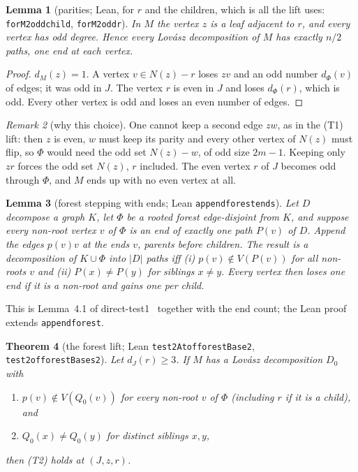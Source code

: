 \documentclass[11pt]{amsart}
\newtheorem{theorem}{Theorem}[section]
\newtheorem{lemma}[theorem]{Lemma}
\theoremstyle{definition}
\theoremstyle{remark}
\newtheorem{remark}[theorem]{Remark}
\renewcommand{\_}{\oldunderscore\allowbreak}
\begin{document}
\begin{lemma}[parities; Lean, for $r$ and the children, which is all the lift uses:
\texttt{forM2\_odd\_child}, \texttt{forM2\_odd\_r}]\label{lem:M}
In $M$ the vertex $z$ is a leaf adjacent to $r$, and \emph{every} vertex has odd degree. Hence every
Lov\'asz decomposition of $M$ has exactly $n/2$ paths, one end at each vertex.
\end{lemma}

\begin{proof}
$d_M(z)=1$. A vertex $v\in N(z)-r$ loses $zv$ and an odd number $d_\Phi(v)$ of edges; it was odd in
$J$. The vertex $r$ is even in $J$ and loses $d_\Phi(r)$, which is odd. Every other vertex is odd
and loses an even number of edges.
\end{proof}

\begin{remark}[why this choice]
One cannot keep a second edge $zw$, as in the (T1) lift: then $z$ is even, $w$ must keep its parity
and every other vertex of $N(z)$ must flip, so $\Phi$ would need the odd set $N(z)-w$, of odd size
$2m-1$. Keeping only $zr$ forces the odd set $N(z)$, $r$ included. The even vertex $r$ of $J$
becomes odd through $\Phi$, and $M$ ends up with no even vertex at all.
\end{remark}

\begin{lemma}[forest stepping with ends; Lean \texttt{append\_forest\_ends}]\label{lem:step}
Let $D$ decompose a graph $K$, let $\Phi$ be a rooted forest edge-disjoint from $K$, and suppose every
non-root vertex $v$ of $\Phi$ is an end of exactly one path $P(v)$ of $D$. Append the edges $p(v)v$ at
the ends $v$, parents before children. The result is a decomposition of $K\cup\Phi$ into $|D|$ paths
iff (i) $p(v)\notin V(P(v))$ for all non-roots $v$ and (ii) $P(x)\ne P(y)$ for siblings $x\ne y$.
Every vertex then loses one end if it is a non-root and gains one per child.
\end{lemma}

This is Lemma~4.1 of direct-test1~\cite{DT1} together with the end count; the Lean proof extends
\texttt{append\_forest}.

\begin{theorem}[the forest lift; Lean \texttt{test2At\_of\_forestBase2}, \texttt{test2\_of\_forestBases2}]\label{thm:lift}
Let $d_J(r)\ge3$. If $M$ has a Lov\'asz decomposition $D_0$ with
\begin{enumerate}[label=(\roman*)]
\item $p(v)\notin V(Q_0(v))$ for every non-root $v$ of $\Phi$ (including $r$ if it is a child), and
\item $Q_0(x)\ne Q_0(y)$ for distinct siblings $x,y$,
\end{enumerate}
then (T2) holds at $(J,z,r)$.
\end{theorem}
\end{document}

